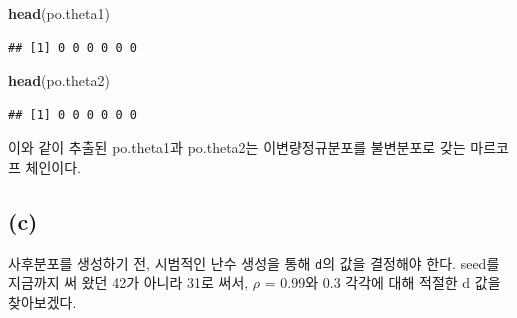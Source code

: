 \documentclass[
]{article}
\newenvironment{Shaded}{\begin{snugshade}}{\end{snugshade}}
\newcommand{\FunctionTok}[1]{\textcolor[rgb]{0.13,0.29,0.53}{\textbf{#1}}}
\newcommand{\NormalTok}[1]{#1}
\begin{document}
\begin{Shaded}
\begin{Highlighting}[]
\FunctionTok{head}\NormalTok{(po.theta1)}
\end{Highlighting}
\end{Shaded}

\begin{verbatim}
## [1] 0 0 0 0 0 0
\end{verbatim}

\begin{Shaded}
\begin{Highlighting}[]
\FunctionTok{head}\NormalTok{(po.theta2)}
\end{Highlighting}
\end{Shaded}

\begin{verbatim}
## [1] 0 0 0 0 0 0
\end{verbatim}

이와 같이 추출된 po.theta1과 po.theta2는 이변량정규분포를 불변분포로
갖는 마르코프 체인이다.

\subsection{(c)}\label{c-1}

사후분포를 생성하기 전, 시범적인 난수 생성을 통해 \texttt{d}의 값을
결정해야 한다. seed를 지금까지 써 왔던 42가 아니라 31로 써서, \(\rho\) =
0.99와 0.3 각각에 대해 적절한 d 값을 찾아보겠다.
\end{document}
